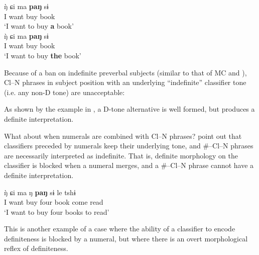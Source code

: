 \documentclass[output=paper
,modfonts
,nonflat]{langsci/langscibook}
\begin{document}
\ea \label{ex:hall:21}
\ea
\gll 
{\`ŋ} ɕi ma \textbf{paŋ} sɨ\\
I want buy {} book\\
\glt
`I want to buy \textbf{a} book'\\
\ex
\gll
{\`ŋ} ɕi ma \textbf{paŋ} sɨ\\
I want buy {} book\\
\glt
`I want to buy \textbf{the} book'\\
\z
\z

Because of a ban on indefinite preverbal subjects (similar to that of MC and ), Cl--N phrases in subject position with an underlying ``indefinite'' classifier tone (i.e. any non-D tone) are unacceptable:

\ea \label{ex:hall:22}
\z 
\z 

As shown by the example in , a D-tone alternative is well formed, but produces a definite interpretation. 

What about when numerals are combined with Cl--N phrases? \citeauthor{ChengSybesma2005} point out that classifiers preceded by numerals keep their underlying tone, and \#--Cl--N phrases are necessarily interpreted as indefinite. That is, definite morphology on the classifier is blocked when a numeral merges, and a \#--Cl--N phrase cannot have a definite interpretation.

\ea 
\gll
{\`ŋ} ɕi ma ŋ \textbf{paŋ} sɨ le tshɨ\\
I want buy four {} book come read\\
\glt
`I want to buy four books to read'\\
\z 

This is another example of a case where the ability of a classifier to encode definiteness is blocked by a numeral, but where there is an overt morphological reflex of definiteness. 
\end{document}
